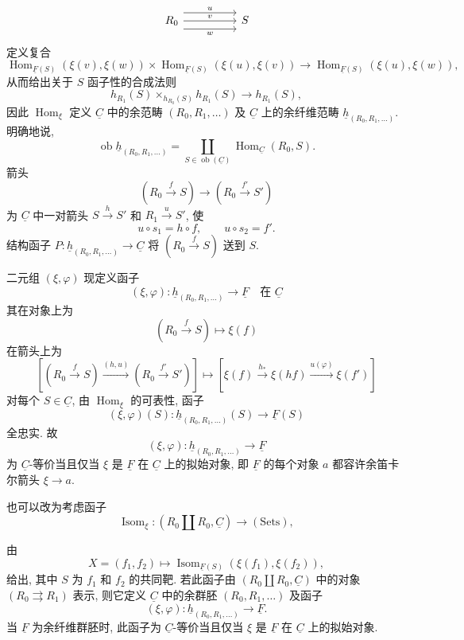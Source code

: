 \[
\begin{tikzcd}[column sep=huge]
 R_0 \arrow[r,shift left=3,"u"]
     \arrow[r,"v"]
     \arrow[r,shift right=3,"w"']
 & S
\end{tikzcd}
\]
定义复合
\[
 \operatorname{Hom}_{\underline F(S)}(\xi(v),\xi(w))
 \times
 \operatorname{Hom}_{\underline F(S)}(\xi(u),\xi(v))
 \longrightarrow
 \operatorname{Hom}_{\underline F(S)}(\xi(u),\xi(w)),
\]
从而给出关于 $S$ 函子性的合成法则
\[
 h_{R_1}(S)\times_{h_{R_0}(S)}h_{R_1}(S)
 \longrightarrow h_{R_1}(S),
\]
因此 $\operatorname{Hom}_\xi$ 定义 $\underline C$ 中的余范畴
$(R_0,R_1,\ldots)$ 及 $\underline C$ 上的余纤维范畴
$\underline h_{(R_0,R_1,\ldots)}$. 明确地说,
\[
 \operatorname{ob}\underline h_{(R_0,R_1,\ldots)}
 =\coprod_{S\in\operatorname{ob}(\underline C)}
   \operatorname{Hom}_{\underline C}(R_0,S).
\]
箭头
\[
 (R_0\xrightarrow fS)\longrightarrow(R_0\xrightarrow{f'}S')
\]
为 $\underline C$ 中一对箭头 $S\xrightarrow hS'$ 和 $R_1\xrightarrow uS'$,
使
\[
 u\circ s_1=h\circ f,
 \qquad u\circ s_2=f'.
\]
结构函子 $P:\underline h_{(R_0,R_1,\ldots)}\longrightarrow\underline C$
将 $(R_0\xrightarrow fS)$ 送到 $S$.

二元组 $(\xi,\varphi)$ 现定义函子
\[
 (\xi,\varphi):\underline h_{(R_0,R_1,\ldots)}
 \longrightarrow\underline F
 \quad\text{在 }\underline C
\]
其在对象上为
\[
 (R_0\xrightarrow fS)\longmapsto\xi(f)
\]
在箭头上为
\[
 \left[(R_0\xrightarrow fS)
 \xrightarrow{(h,u)}(R_0\xrightarrow{f'}S')\right]
 \longmapsto
 \left[\xi(f)\xrightarrow{h_*}\xi(hf)
 \xrightarrow{u(\varphi)}\xi(f')\right]
\]
对每个 $S\in\underline C$, 由 $\operatorname{Hom}_\xi$ 的可表性, 函子
\[
 (\xi,\varphi)(S):
 \underline h_{(R_0,R_1,\ldots)}(S)\longrightarrow\underline F(S)
\]
全忠实. 故
\[
 (\xi,\varphi):\underline h_{(R_0,R_1,\ldots)}
 \longrightarrow\underline F
\]
为 $\underline C$-等价当且仅当 $\xi$ 是 $\underline F$
在 $\underline C$ 上的拟始对象, 即 $\underline F$ 的每个对象 $a$
都容许余笛卡尔箭头 $\xi\longrightarrow a$.

也可以改为考虑函子
\[
 \operatorname{Isom}_\xi:
 (R_0\amalg R_0,\underline C)\longrightarrow(\mathrm{Sets}),
\]


由
\[
 X=(f_1,f_2)\longmapsto
 \operatorname{Isom}_{\underline F(S)}(\xi(f_1),\xi(f_2)),
\]
给出, 其中 $S$ 为 $f_1$ 和 $f_2$ 的共同靶.
若此函子由 $(R_0\amalg R_0,\underline C)$ 中的对象
$(R_0\rightrightarrows R_1)$ 表示,
则它定义 $\underline C$ 中的余群胚 $(R_0,R_1,\ldots)$ 及函子
\[
 (\xi,\varphi):\underline h_{(R_0,R_1,\ldots)}
 \longrightarrow\underline F.
\]
当 $\underline F$ 为余纤维群胚时, 此函子为 $\underline C$-等价当且仅当
$\xi$ 是 $\underline F$ 在 $\underline C$ 上的拟始对象.

